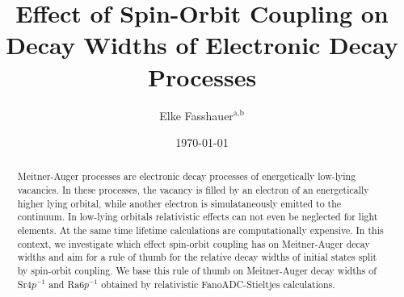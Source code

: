 \documentclass[aps,amssymb,preprint,a4paper]{revtex4}
\begin{document}
\newcommand{\wignerj}[6]{\mbox{$\left( \begin{array}{ccc} #1 & #2 & #3 \\ #4 & #5 & #6 \end{array} \right)$}}
\newcommand{\redume}[3]{\mbox{$( #1 || #2 || #3 )$}}

\setlength{\tabcolsep}{12pt}


\title{Effect of Spin-Orbit Coupling on Decay Widths of Electronic Decay Processes}

\author{Elke Fasshauer$^{\text{a,b}}$}



\date{\today}

%

\begin{abstract}
Meitner-Auger processes are electronic decay processes of energetically low-lying
vacancies. In these processes, the vacancy is filled by an electron of
an energetically higher lying orbital, while another electron is simulataneously
emitted to the continuum.
In low-lying orbitals relativistic effects can not even be neglected for light
elements. At the same time lifetime calculations are computationally expensive.
In this context, we investigate which effect spin-orbit coupling has on
Meitner-Auger
decay widths and aim for a rule of thumb for the relative decay widths of
initial states split by spin-orbit coupling.
We base this rule of thumb on Meitner-Auger decay widths
of Sr$4p^{-1}$ and Ra$6p^{-1}$
obtained by relativistic FanoADC-Stieltjes calculations.
\end{abstract}

\maketitle


%
\end{document}
